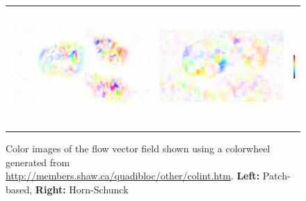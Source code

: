\documentclass[11pt]{article}
\begin{document}
\vspace{-25pt}
\begin{figure}[hb]
\begin{tabular}{ccc}
\includegraphics[width=0.5\linewidth]{../img_hs.png} &
\includegraphics[width=0.47\linewidth]{../img_lk.png} &
\includegraphics[width=0.03\linewidth,height=4.5cm]{../colorbar.png} \\
\end{tabular}
\caption{Color images of the flow vector field shown using a colorwheel generated from \url{http://members.shaw.ca/quadibloc/other/colint.htm}. {\bf Left:} Patch-based, {\bf Right:} Horn-Schunck}
\label{fig10}
\end{figure}
\end{document}

